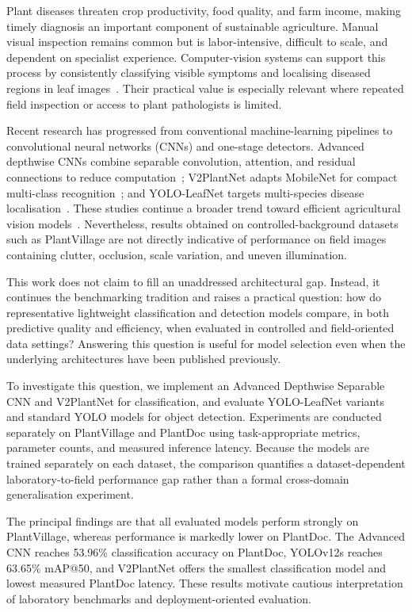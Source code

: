 \documentclass[10pt, conference]{IEEEtran}
\begin{document}
Plant diseases threaten crop productivity, food quality, and farm income, making timely diagnosis an important component of sustainable agriculture. Manual visual inspection remains common but is labor-intensive, difficult to scale, and dependent on specialist experience. Computer-vision systems can support this process by consistently classifying visible symptoms and localising diseased regions in leaf images~\cite{harakannanavar2022,zhao2025,salka2025}. Their practical value is especially relevant where repeated field inspection or access to plant pathologists is limited.

Recent research has progressed from conventional machine-learning pipelines to convolutional neural networks (CNNs) and one-stage detectors. Advanced depthwise CNNs combine separable convolution, attention, and residual connections to reduce computation~\cite{ashurov2025}; V2PlantNet adapts MobileNet for compact multi-class recognition~\cite{nnamdi2025}; and YOLO-LeafNet targets multi-species disease localisation~\cite{kaur2025}. These studies continue a broader trend toward efficient agricultural vision models~\cite{sujatha2025}. Nevertheless, results obtained on controlled-background datasets such as PlantVillage are not directly indicative of performance on field images containing clutter, occlusion, scale variation, and uneven illumination.

This work does not claim to fill an unaddressed architectural gap. Instead, it continues the benchmarking tradition and raises a practical question: how do representative lightweight classification and detection models compare, in both predictive quality and efficiency, when evaluated in controlled and field-oriented data settings? Answering this question is useful for model selection even when the underlying architectures have been published previously.

To investigate this question, we implement an Advanced Depthwise Separable CNN and V2PlantNet for classification, and evaluate YOLO-LeafNet variants and standard YOLO models for object detection. Experiments are conducted separately on PlantVillage and PlantDoc using task-appropriate metrics, parameter counts, and measured inference latency. Because the models are trained separately on each dataset, the comparison quantifies a dataset-dependent laboratory-to-field performance gap rather than a formal cross-domain generalisation experiment.

The principal findings are that all evaluated models perform strongly on PlantVillage, whereas performance is markedly lower on PlantDoc. The Advanced CNN reaches 53.96\% classification accuracy on PlantDoc, YOLOv12s reaches 63.65\% mAP@50, and V2PlantNet offers the smallest classification model and lowest measured PlantDoc latency. These results motivate cautious interpretation of laboratory benchmarks and deployment-oriented evaluation.
\end{document}
